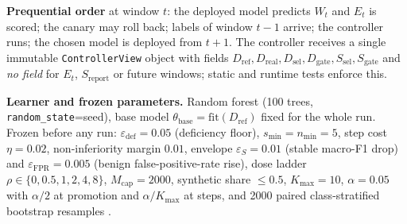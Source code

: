\documentclass[conference]{IEEEtran}
\newcommand{\thb}{\theta_{\mathrm{base}}}
\newcommand{\eps}{\varepsilon}
\begin{document}
\textbf{Prequential order} at window $t$: the deployed model predicts $W_t$ and $E_t$ is scored; the canary may roll back; labels of
window $t-1$ arrive; the controller runs; the chosen model is deployed from $t+1$. The controller receives a single immutable
\texttt{ControllerView} object with fields $D_{\mathrm{ref}},D_{\mathrm{real}},D_{\mathrm{sel}},D_{\mathrm{gate}},S_{\mathrm{sel}},S_{\mathrm{gate}}$ and \emph{no field} for $E_t$, $S_{\mathrm{report}}$ or
future windows; static and runtime tests enforce this.

\textbf{Learner and frozen parameters.} Random forest (100 trees, \texttt{random\_state}=seed), base model
$\thb=\mathrm{fit}(D_{\mathrm{ref}})$ fixed for the whole run. Frozen before any run: $\eps_{\mathrm{def}}{=}0.05$ (deficiency floor), $s_{\min}{=}n_{\min}{=}5$, step cost $\eta{=}0.02$,
non-inferiority margin $0.01$, envelope $\eps_S{=}0.01$ (stable macro-F1 drop) and $\eps_{\mathrm{FPR}}{=}0.005$ (benign false-positive-rate rise),
dose ladder $\rho\in\{0,0.5,1,2,4,8\}$, $M_{\mathrm{cap}}{=}2000$, synthetic share $\le0.5$, $K_{\max}{=}10$, $\alpha{=}0.05$ with $\alpha/2$ at promotion and $\alpha/K_{\max}$ at steps,
and 2000 paired class-stratified bootstrap resamples \cite{efron1979}.
\end{document}
